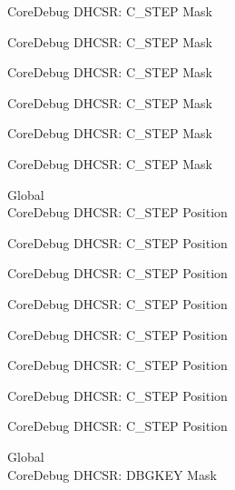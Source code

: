 \begin{DoxyRefList}
\label{deprecated__deprecated000180}%
%
Core\+Debug DHCSR\+: C\+\_\+\+STEP Mask 

\label{deprecated__deprecated000263}%
%
Core\+Debug DHCSR\+: C\+\_\+\+STEP Mask 

\label{deprecated__deprecated000322}%
%
Core\+Debug DHCSR\+: C\+\_\+\+STEP Mask 

\label{deprecated__deprecated000398}%
%
Core\+Debug DHCSR\+: C\+\_\+\+STEP Mask 

\label{deprecated__deprecated000487}%
%
Core\+Debug DHCSR\+: C\+\_\+\+STEP Mask 

\label{deprecated__deprecated000589}%
%
Core\+Debug DHCSR\+: C\+\_\+\+STEP Mask  
\item[Global \doxylink{group___c_m_s_i_s___core_debug_gae1fc39e80de54c0339cbb1b298a9f0f9}{Core\+Debug\+\_\+\+DHCSR\+\_\+\+C\+\_\+\+STEP\+\_\+\+Pos} ]\hfill \\
\label{deprecated__deprecated000035}%
%
Core\+Debug DHCSR\+: C\+\_\+\+STEP Position 

\label{deprecated__deprecated000123}%
%
Core\+Debug DHCSR\+: C\+\_\+\+STEP Position 

\label{deprecated__deprecated000179}%
%
Core\+Debug DHCSR\+: C\+\_\+\+STEP Position 

\label{deprecated__deprecated000262}%
%
Core\+Debug DHCSR\+: C\+\_\+\+STEP Position 

\label{deprecated__deprecated000321}%
%
Core\+Debug DHCSR\+: C\+\_\+\+STEP Position 

\label{deprecated__deprecated000397}%
%
Core\+Debug DHCSR\+: C\+\_\+\+STEP Position 

\label{deprecated__deprecated000486}%
%
Core\+Debug DHCSR\+: C\+\_\+\+STEP Position 

\label{deprecated__deprecated000588}%
%
Core\+Debug DHCSR\+: C\+\_\+\+STEP Position  
\item[Global \doxylink{group___c_m_s_i_s___core_debug_ga1ce997cee15edaafe4aed77751816ffc}{Core\+Debug\+\_\+\+DHCSR\+\_\+\+DBGKEY\+\_\+\+Msk} ]\hfill \\
\label{deprecated__deprecated000006}%
%
Core\+Debug DHCSR\+: DBGKEY Mask 


\end{DoxyRefList}
